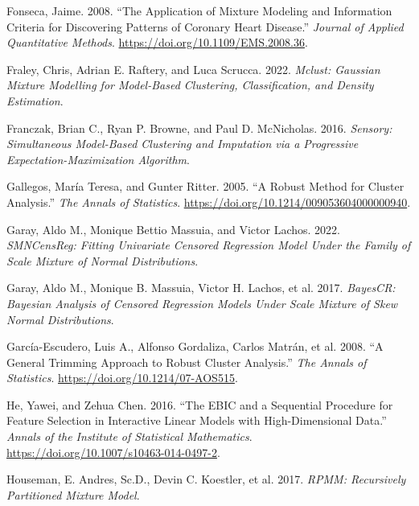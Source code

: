 \begin{CSLReferences}{1}{0}
\leavevmode{}%
Fonseca, Jaime. 2008. {``The Application of Mixture Modeling and Information Criteria for Discovering Patterns of Coronary Heart Disease.''} \emph{Journal of Applied Quantitative Methods}. \url{https://doi.org/10.1109/EMS.2008.36}.

\leavevmode{}%
Fraley, Chris, Adrian E. Raftery, and Luca Scrucca. 2022. \emph{Mclust: Gaussian Mixture Modelling for Model-Based Clustering, Classification, and Density Estimation}.

\leavevmode{}%
Franczak, Brian C., Ryan P. Browne, and Paul D. McNicholas. 2016. \emph{Sensory: Simultaneous Model-Based Clustering and Imputation via a Progressive Expectation-Maximization Algorithm}.

\leavevmode{}%
Gallegos, María Teresa, and Gunter Ritter. 2005. {``A Robust Method for Cluster Analysis.''} \emph{The Annals of Statistics}. \url{https://doi.org/10.1214/009053604000000940}.

\leavevmode{}%
Garay, Aldo M., Monique Bettio Massuia, and Victor Lachos. 2022. \emph{SMNCensReg: Fitting Univariate Censored Regression Model Under the Family of Scale Mixture of Normal Distributions}.

\leavevmode{}%
Garay, Aldo M., Monique B. Massuia, Victor H. Lachos, et al. 2017. \emph{BayesCR: Bayesian Analysis of Censored Regression Models Under Scale Mixture of Skew Normal Distributions}.

\leavevmode{}%
García-Escudero, Luis A., Alfonso Gordaliza, Carlos Matrán, et al. 2008. {``A General Trimming Approach to Robust Cluster Analysis.''} \emph{The Annals of Statistics}. \url{https://doi.org/10.1214/07-AOS515}.

\leavevmode{}%
He, Yawei, and Zehua Chen. 2016. {``The {EBIC} and a Sequential Procedure for Feature Selection in Interactive Linear Models with High-Dimensional Data.''} \emph{Annals of the Institute of Statistical Mathematics}. \url{https://doi.org/10.1007/s10463-014-0497-2}.

\leavevmode{}%
Houseman, E. Andres, Sc.D., Devin C. Koestler, et al. 2017. \emph{RPMM: Recursively Partitioned Mixture Model}.


\end{CSLReferences}
